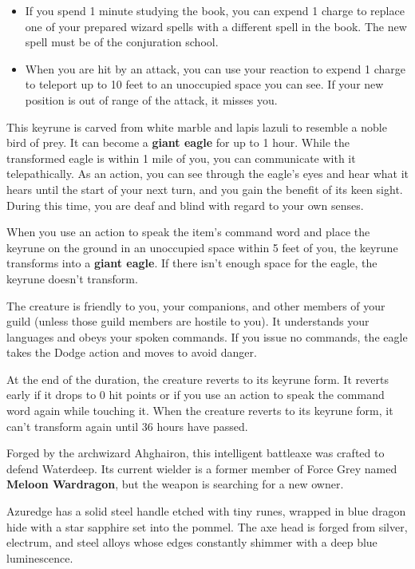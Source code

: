 \documentclass[10pt,a4paper,twoside,bg=print,twocolumn,openany,nodeprecatedcode]{dndbook}
\begin{document}
\begin{itemize}
\item If you spend 1 minute studying the book, you can expend 1 charge to replace one of your prepared wizard spells with a different spell in the book. The new spell must be of the conjuration school.
\item When you are hit by an attack, you can use your reaction to expend 1 charge to teleport up to 10 feet to an unoccupied space you can see. If your new position is out of range of the attack, it misses you.
\end{itemize}

This keyrune is carved from white marble and lapis lazuli to resemble a noble bird of prey. It can become a \textbf{giant eagle} for up to 1 hour. While the transformed eagle is within 1 mile of you, you can communicate with it telepathically. As an action, you can see through the eagle's eyes and hear what it hears until the start of your next turn, and you gain the benefit of its keen sight. During this time, you are deaf and blind with regard to your own senses.

When you use an action to speak the item's command word and place the keyrune on the ground in an unoccupied space within 5 feet of you, the keyrune transforms into a \textbf{giant eagle}. If there isn't enough space for the eagle, the keyrune doesn't transform.

The creature is friendly to you, your companions, and other members of your guild (unless those guild members are hostile to you). It understands your languages and obeys your spoken commands. If you issue no commands, the eagle takes the Dodge action and moves to avoid danger.

At the end of the duration, the creature reverts to its keyrune form. It reverts early if it drops to 0 hit points or if you use an action to speak the command word again while touching it. When the creature reverts to its keyrune form, it can't transform again until 36 hours have passed.

Forged by the archwizard Ahghairon, this intelligent battleaxe was crafted to defend Waterdeep. Its current wielder is a former member of Force Grey named \textbf{Meloon Wardragon}, but the weapon is searching for a new owner.

Azuredge has a solid steel handle etched with tiny runes, wrapped in blue dragon hide with a star sapphire set into the pommel. The axe head is forged from silver, electrum, and steel alloys whose edges constantly shimmer with a deep blue luminescence.
\end{document}

